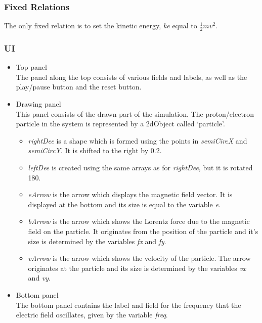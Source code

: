 \documentclass[11pt]{article}
\begin{document}
\subsubsection*{Fixed Relations}
\label{sec-1-3-5}

The only fixed relation is to set the kinetic energy, \emph{ke} equal to $\frac{1}{2}mv^2$.
\subsubsection*{UI}
\label{sec-1-3-6}
\begin{itemize}

\item Top panel\\
\label{sec-1-3-6-1}%
The panel along the top consists of various fields and labels, as well
as the play/pause button and the reset button.

\item Drawing panel\\
\label{sec-1-3-6-2}%
This panel consists of the drawn part of the simulation. The
proton/electron particle in the system is represented by a 2dObject
called `particle'.
\begin{itemize}
\item \emph{rightDee} is a shape which is formed using the points in
  \emph{semiCircX} and \emph{semiCircY}. It is shifted to the right by 0.2.
\item \emph{leftDee} is created using the same arrays as for \emph{rightDee}, but it
  is rotated 180\textdegree{}.
\item \emph{eArrow} is the arrow which displays the magnetic field vector. It
  is displayed at the bottom and its size is equal to the variable \emph{e}.
\item \emph{bArrow} is the arrow which shows the Lorentz force due to the
  magnetic field on the particle. It originates from the position of
  the particle and it's size is determined by the variables \emph{fx} and \emph{fy}.
\item \emph{vArrow} is the arrow which shows the velocity of the particle. The
  arrow originates at the particle and its size is determined by the
  variables \emph{vx} and \emph{vy}.
\end{itemize}

\item Bottom panel\\
\label{sec-1-3-6-3}%
The bottom panel contains the label and field for the frequency that
the electric field oscillates, given by the variable \emph{freq}.


\end{itemize}
\end{document}
